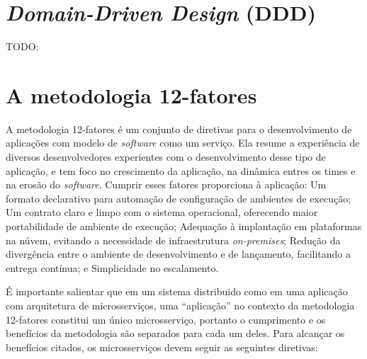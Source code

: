\section{\emph{Domain-Driven Design} (DDD)}\label{section-ddd}
TODO: 

\section{A metodologia 12-fatores}

A metodologia 12-fatores é um conjunto de diretivas para o desenvolvimento de aplicações com modelo de \emph{software} como um serviço. Ela resume a experiência de diversos desenvolvedores experientes com o desenvolvimento desse tipo de aplicação, e tem foco no crescimento da aplicação, na dinâmica entres os times e na erosão do \emph{software}. Cumprir esses fatores proporciona à aplicação: Um formato declarativo para automação de configuração de ambientes de execução; Um contrato claro e limpo com o sistema operacional, oferecendo maior portabilidade de ambiente de execução; Adequação à implantação em plataformas na núvem, evitando a necessidade de infraestrutura \emph{on-premises}; Redução da divergência entre o ambiente de desenvolvimento e de lançamento, facilitando a entrega contínua; e Simplicidade no escalamento. \cite{12factor, 12fatores-rita}

É importante salientar que em um sistema distribuido como em uma aplicação com arquitetura de microsserviços, uma “aplicação” no contexto da metodologia 12-fatores constitui um único microsserviço, portanto o cumprimento e os benefícios da metodologia são separados para cada um deles. Para alcançar os benefícios citados, os microsserviços devem seguir as seguintes diretivas:






